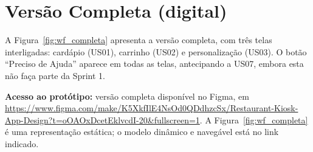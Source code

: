 \documentclass[12pt, oneside, a4paper, chapter=TITLE,section=TITLE]{abntex2}
\begin{document}
\section{Versão Completa (digital)}

A Figura~\ref{fig:wf_completa} apresenta a versão completa, com três telas interligadas: cardápio (US01), carrinho (US02) e personalização (US03). O botão ``Preciso de Ajuda'' aparece em todas as telas, antecipando a US07, embora esta não faça parte da Sprint 1.

\textbf{Acesso ao protótipo:} versão completa disponível no Figma, em \url{https://www.figma.com/make/K5XkfIlE4NsOd0QDdhzcSx/Restaurant-Kiosk-App-Design?t=oOAOxDcetEklvcdI-20&fullscreen=1}. A Figura~\ref{fig:wf_completa} é uma representação estática; o modelo dinâmico e navegável está no link indicado.
\end{document}
